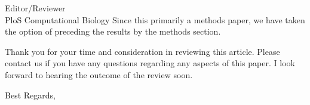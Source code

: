 \documentclass[a4paper,10pt]{letter}
\begin{document}
\begin{letter}{Editor/Reviewer \\ PloS Computational Biology}
Since this primarily a methods paper, we have taken the option of preceding the results by the methods section.

Thank you for your time and consideration in reviewing this article. Please contact us if you have any questions regarding any aspects of this paper. I look forward to hearing the outcome of the review soon.

\closing{Best Regards,}

% 
\end{letter}
\end{document}
